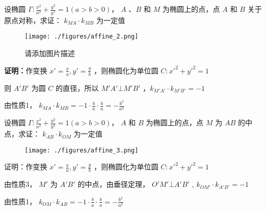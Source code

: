 \begin{corollary}{}
设椭圆 \(\Gamma:\frac{x^2}{a^2}+\frac{y^2}{b^2}=1(a>b>0)\)， \(A\) 、\(B\) 和 \(M\) 为椭圆上的点，点 \(A\) 和 \(B\) 关于原点对称，求证： \(k_{MA}\cdot k_{MB}\) 为一定值
​
\begin{figure}[ht]
\centering
\texttt{[image: ./figures/affine\_2.png]}
\caption{请添加图片描述} \label{affine_fig2}
\end{figure}

\textbf{证明：}作变换 \(x'=\frac{x}{a},y'=\frac{y}{b}\) ，则椭圆化为单位圆 \(C:x'^2+y'^2=1\)

则 \(A'B'\) 为圆 \(C\) 的直径，所以 \(M'A'\bot M'B'\) ，\(k_{M'A'}\cdot k_{M'B'}=-1\)

由性质1， \(k_{MA}\cdot k_{MB}=-1\cdot \frac{b}{a}\cdot \frac{b}{a}=-\frac{b^2}{a^2}\)

\end{corollary}

\begin{corollary}{}
设椭圆 \(\Gamma:\frac{x^2}{a^2}+\frac{y^2}{b^2}=1(a>b>0)\)， \(A\) 和 \(B\) 为椭圆上的点，点 \(M\) 为 \(AB\) 的中点，求证： \(k_{AB}\cdot k_{OM}\) 为一定值

\begin{figure}[ht]
\centering
\texttt{[image: ./figures/affine\_3.png]}
\caption{} \label{affine_fig3}
\end{figure}

证明：作变换 \(x'=\frac{x}{a},y'=\frac{y}{b}\) ，则椭圆化为单位圆 \(C:x'^2+y'^2=1\)

由性质3， \(M'\) 为 \(A'B'\) 的中点，由垂径定理， \(O'M'\bot A'B'\) , \(k_{OM'}\cdot k_{A'B'}=-1\)

由性质1， \(k_{OM}\cdot k_{AB}=-1\cdot \frac{b}{a}\cdot \frac{b}{a}=-\frac{b^2}{a^2}\)

\end{corollary} 

